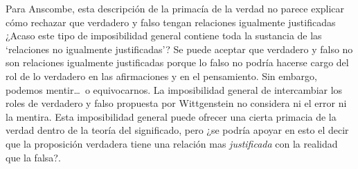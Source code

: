 Para Anscombe, esta descripción de la primacía de la verdad no parece explicar
cómo rechazar que verdadero y falso tengan relaciones igualmente justificadas
¿Acaso este tipo de imposibilidad general contiene toda la sustancia de las
`relaciones no igualmente justificadas'? Se puede aceptar que verdadero y falso
no son relaciones igualmente justificadas porque lo falso no podría hacerse
cargo del rol de lo verdadero en las afirmaciones y en el pensamiento. Sin
embargo, podemos mentir\ldots\, o equivocarnos. La imposibilidad general de
intercambiar los roles de verdadero y falso propuesta por Wittgenstein no
considera ni el error ni la mentira. Esta imposibilidad general puede ofrecer
una cierta primacia de la verdad dentro de la teoría del significado, pero ¿se
podría apoyar en esto el decir que la proposición verdadera tiene una relación
mas \emph{justificada} con la realidad que la
falsa?\autocite[Cf.~][75]{anscombe2011plato:truth}.

